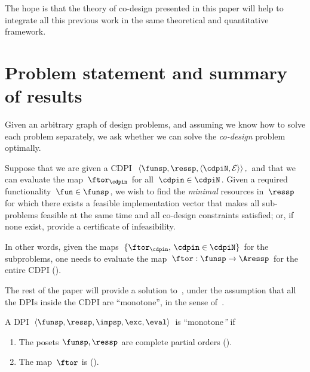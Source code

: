 The hope is that the theory of co-design presented in this paper will
help to integrate all this previous work in the same theoretical and
quantitative framework.


\section{Problem statement and summary of results\label{sec:Optimization}}

Given an arbitrary graph of design problems, and assuming we know
how to solve each problem separately, we ask whether we can solve
the \emph{co-design} problem optimally. 
\begin{problem}
\label{prob:MCDP}Suppose that we are given a CDPI~$\left\langle \funsp,\ressp,\left\langle \cdpiN,\mathcal{E}\right\rangle \right\rangle ,$
and that we can evaluate the map~$\ftor_{\cdpin}$ for all~$\cdpin\in\cdpiN$.
Given a required functionality~$\fun\in\funsp$, we wish to find
the \emph{minimal} resources in~$\ressp$ for which there exists
a feasible implementation vector that makes all sub-problems feasible
at the same time and all co-design constraints satisfied; or, if
none exist, provide a certificate of infeasibility. 
\end{problem}
In other words, given the maps~$\{\ftor_{\cdpin},\,\cdpin\in\cdpiN\}$
for the subproblems, one needs to evaluate the map~$\ftor:\funsp\rightarrow\Aressp$
for the entire CDPI (). 


The rest of the paper will provide a solution to~,
under the assumption that all the DPIs inside the CDPI are ``monotone'',
in the sense of~.
\begin{defn}
\label{def:DPI-monotone}A DPI $\left\langle \funsp,\ressp,\impsp,\exc,\eval\right\rangle $
is ``monotone\emph{''} if
\begin{enumerate}
\item The posets $\funsp,\ressp$ are complete partial orders ().
\item The map~$\ftor$ is \scottcontinuous ().
\end{enumerate}
\end{defn}


